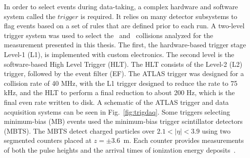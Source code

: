 {In order to select events during data-taking, a complex hardware and software system called the $trigger$ is required. It relies on many detector subsystems to flag events based on a set of rules that are defined prior to each run. A two-level trigger system was used to select the \pp\ and \pPb\ collisions analyzed for the measurement presented in this thesis. The first, the hardware-based trigger stage Level-1 (L1), is implemented with custom electronics. The second level is the software-based High Level Trigger (HLT). The HLT consists of the Level-2 (L2) trigger, followed by the event filter (EF). The ATLAS trigger was designed for a collision rate of 40 MHz, with the L1 trigger designed to reduce the rate to 75 kHz, and the HLT to perform a final reduction to about 200 Hz, which is the final even rate written to disk. A schematic of the ATLAS trigger and data acquisition systems can be seen in Fig.~\ref{fig:trigdaq}. Some triggers selecting minimum-bias (MB) events used the minimum-bias trigger scintillator detectors (MBTS). The MBTS detect charged particles over $2.1 < |\eta| < 3.9$ using two segmented counters placed at $z = \pm 3.6$~m. Each counter provides measurements of both the pulse heights and the arrival times of ionization energy deposits~\cite{Aad:2008zzm}.

}
